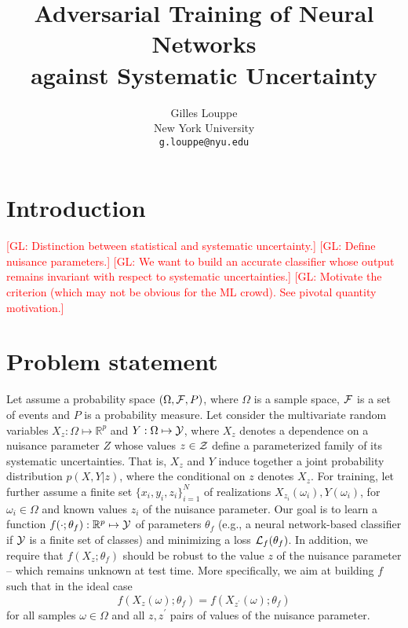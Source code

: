 \documentclass{article}
\title{Adversarial Training of Neural Networks\\
against Systematic Uncertainty}
\author{
  Gilles Louppe \\
  New York University\\
  \texttt{g.louppe@nyu.edu} \\
}
\newcommand{\glnote}[1]{\textcolor{red}{[GL: #1]}}
\theoremstyle{plain}
\begin{document}
\maketitle


\begin{abstract}
\end{abstract}



\section{Introduction}

\glnote{Distinction between statistical and systematic uncertainty.}
\glnote{Define nuisance parameters.}
\glnote{We want to build an accurate classifier whose output remains invariant with
respect to systematic uncertainties.}
\glnote{Motivate the criterion (which may not be obvious for the ML crowd). See pivotal quantity motivation.}



\section{Problem statement}
\label{sec:problem}

Let assume a probability space $(\Omega, {\cal F}, P)$, where $\Omega$ is a
sample space, ${\cal F}$ is a set of events and $P$ is a probability measure.
Let consider the multivariate random variables $X_z: \Omega \mapsto
\mathbb{R}^p$ and $Y: \Omega \mapsto {\cal Y}$, where $X_z$ denotes a dependence on a
nuisance parameter $Z$ whose values $z \in {\cal Z}$  define a
parameterized family of its systematic uncertainties. That is, $X_z$ and
$Y$ induce together a joint probability distribution $p(X,Y|z)$, where the
conditional on $z$ denotes $X_z$. For training, let further assume a
finite set $\{ x_i, y_i, z_i \}_{i=1}^N$ of realizations
$X_{z_i}(\omega_i), Y(\omega_i)$, for $\omega_i \in \Omega$ and known
values $z_i$ of the nuisance parameter. Our goal is to learn a function
$f(\cdot;\theta_f) : \mathbb{R}^p \mapsto {\cal Y}$ of parameters $\theta_f$
(e.g., a neural network-based classifier if ${\cal Y}$ is a finite set of
classes) and minimizing  a loss ${\cal L}_f(\theta_f)$. In addition, we require
that $f(X_z ; \theta_f)$ should be robust to the value $z$ of the nuisance parameter  --
which remains unknown at test time. More specifically, we aim at building $f$
such that in the ideal case
\begin{equation}\label{eqn:criterion-true}
f(X_{z}(\omega) ; \theta_f) = f(X_{z^\prime}(\omega) ; \theta_f)
\end{equation} for all
samples $\omega \in \Omega$ and all $z, z^\prime$ pairs of values of the
nuisance parameter.
\end{document}
